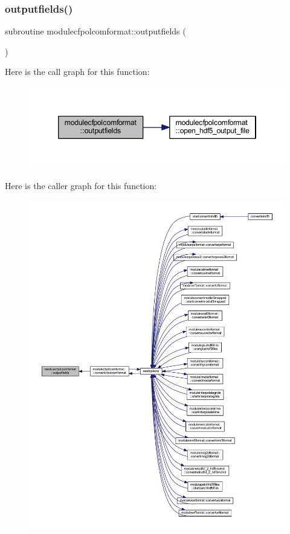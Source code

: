 \subsubsection{\texorpdfstring{outputfields()}{outputfields()}}
{\footnotesize\ttfamily subroutine modulecfpolcomformat\+::outputfields (\begin{DoxyParamCaption}{ }\end{DoxyParamCaption})\hspace{0.3cm}{\ttfamily [private]}}

Here is the call graph for this function\+:\nopagebreak
\begin{figure}[H]
\begin{center}
\leavevmode
\includegraphics[width=346pt]{namespacemodulecfpolcomformat_a5d472a387fb496b9a4ae576e445acaa3_cgraph}
\end{center}
\end{figure}
Here is the caller graph for this function\+:\nopagebreak
\begin{figure}[H]
\begin{center}
\leavevmode
\includegraphics[width=350pt]{namespacemodulecfpolcomformat_a5d472a387fb496b9a4ae576e445acaa3_icgraph}
\end{center}
\end{figure}
